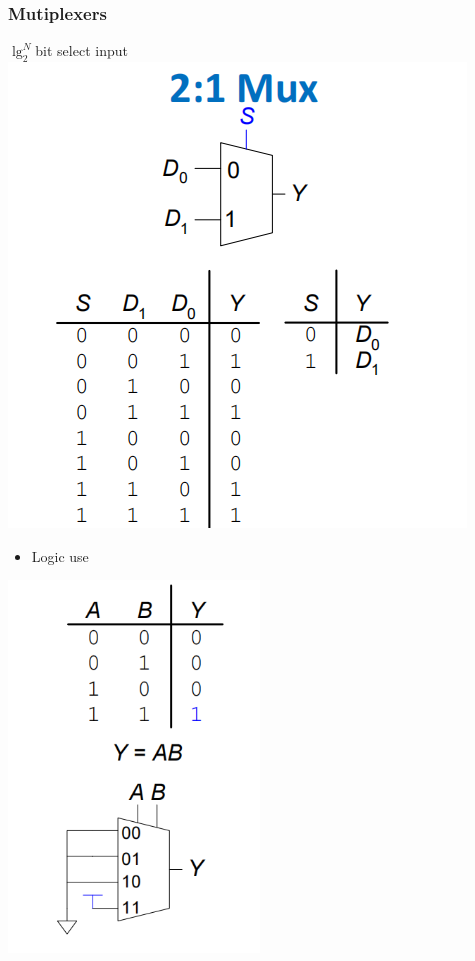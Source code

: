 \documentclass[12pt]{article}
\begin{document}
\subsubsection{Mutiplexers}
$\lg_{2}^{N}$bit select input
\newline
\includegraphics[width=\textwidth]{Mux.png}
\begin{itemize}
    \item Logic use
\end{itemize}
\includegraphics[width=0.5\textwidth]{LogicMux.png}
\end{document}
